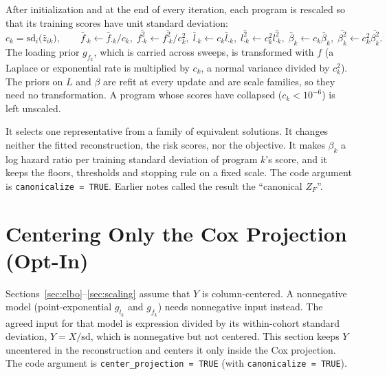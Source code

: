 \documentclass[11pt]{article}
\newcommand{\lbar}[2]{\bar{l}_{#1#2}}
\newcommand{\fbar}[2]{\bar{f}_{#1#2}}
\newcommand{\zbar}[2]{\bar{z}_{#1#2}}
\newcommand{\betabar}[1]{\bar{\beta}_{#1}}
\newcommand{\lsec}[2]{\overline{l^2_{#1#2}}}
\newcommand{\fsec}[2]{\overline{f^2_{#1#2}}}
\newcommand{\betasec}[1]{\overline{\beta^2_{#1}}}
\begin{document}
After initialization and at the end of every iteration, each program is
rescaled so that its training scores have unit standard deviation:
\begin{equation}\label{eq:scaling}
  c_k = \mathrm{sd}_i\bigl(\zbar{i}{k}\bigr), \qquad
  \fbar{\cdot}{k}\leftarrow\fbar{\cdot}{k}/c_k,\;
  \fsec{\cdot}{k}\leftarrow\fsec{\cdot}{k}/c_k^2,\;
  \lbar{\cdot}{k}\leftarrow c_k\lbar{\cdot}{k},\;
  \lsec{\cdot}{k}\leftarrow c_k^2\lsec{\cdot}{k},\;
  \betabar{k}\leftarrow c_k\betabar{k},\;
  \betasec{k}\leftarrow c_k^2\betasec{k}.
\end{equation}
The loading prior $g_{f_k}$, which is carried across sweeps, is transformed with
$f$ (a Laplace or exponential rate is multiplied by $c_k$, a normal variance
divided by $c_k^2$). The priors on $L$ and $\beta$ are refit at every update and
are scale families, so they need no transformation. A program whose scores have
collapsed ($c_k < 10^{-6}$) is left unscaled.

\begin{keybox}
It selects one representative from a family of equivalent solutions. It changes
neither the fitted reconstruction, the risk scores, nor the objective. It makes
$\beta_k$ a log hazard ratio per training standard deviation of program $k$'s
score, and it keeps the floors, thresholds and stopping rule on a fixed scale. The
code argument is \texttt{canonicalize = TRUE}. Earlier notes called the result
the ``canonical $Z_F$''.
\end{keybox}

\section{Centering Only the Cox Projection (Opt-In)}\label{sec:center}

Sections~\ref{sec:elbo}--\ref{sec:scaling} assume that $Y$ is column-centered.
A nonnegative model (point-exponential $g_{l_k}$ and $g_{f_k}$) needs
nonnegative input instead. The agreed input for that model is expression
divided by its within-cohort standard deviation, $Y = X/\mathrm{sd}$, which is
nonnegative but not centered. This section keeps $Y$ uncentered in the
reconstruction and centers it only inside the Cox projection. The code
argument is \texttt{center\_projection = TRUE} (with \texttt{canonicalize = TRUE}).
\end{document}
